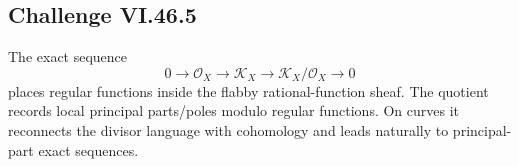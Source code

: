 \subsection*{Challenge VI.46.5}
\begin{solution}
The exact sequence
\[
0\to\mathcal O_X\to\mathcal K_X\to\mathcal K_X/\mathcal O_X\to0
\]
places regular functions inside the flabby rational-function sheaf.  The quotient records local principal parts/poles modulo regular functions.  On curves it reconnects the divisor language with cohomology and leads naturally to principal-part exact sequences.
\end{solution}

